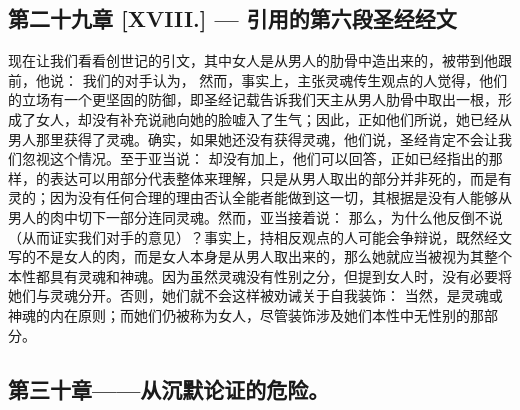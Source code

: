 
\subsection{第二十九章 [XVIII.] — 引用的第六段圣经经文}

现在让我们看看创世记的引文，其中女人是从男人的肋骨中造出来的，被带到他跟前，他说： 我们的对手认为， 然而，事实上，主张灵魂传生观点的人觉得，他们的立场有一个更坚固的防御，即圣经记载告诉我们天主从男人肋骨中取出一根，形成了女人，却没有补充说祂向她的脸嘘入了生气；因此，正如他们所说，她已经从男人那里获得了灵魂。确实，如果她还没有获得灵魂，他们说，圣经肯定不会让我们忽视这个情况。至于亚当说： 却没有加上，他们可以回答，正如已经指出的那样，的表达可以用部分代表整体来理解，只是从男人取出的部分并非死的，而是有灵的；因为没有任何合理的理由否认全能者能做到这一切，其根据是没有人能够从男人的肉中切下一部分连同灵魂。然而，亚当接着说： 那么，为什么他反倒不说（从而证实我们对手的意见）？事实上，持相反观点的人可能会争辩说，既然经文写的不是女人的肉，而是女人本身是从男人取出来的，那么她就应当被视为其整个本性都具有灵魂和神魂。因为虽然灵魂没有性别之分，但提到女人时，没有必要将她们与灵魂分开。否则，她们就不会这样被劝诫关于自我装饰： 当然，是灵魂或神魂的内在原则；而她们仍被称为女人，尽管装饰涉及她们本性中无性别的那部分。\par


\subsection{第三十章——从沉默论证的危险。}

